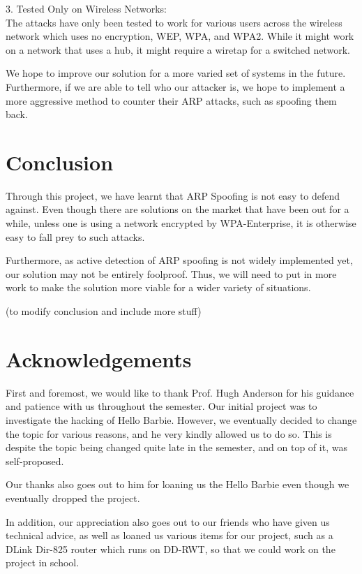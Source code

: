 \documentclass{acm_proc_article-sp}
\begin{document}
3. Tested Only on Wireless Networks:\\
The attacks have only been tested to work for various users across the wireless network which uses no encryption, WEP, WPA, and WPA2. While it might work on a network that uses a hub, it might require a wiretap for a switched network.  

We hope to improve our solution for a more varied set of systems in the future. Furthermore, if we are able to tell who our attacker is, we hope to implement a more aggressive method to counter their ARP attacks, such as spoofing them back. 

\section{Conclusion}
Through this project, we have learnt that ARP Spoofing is not easy to defend against. Even though there are solutions on the market that have been out for a while, unless one is using a network encrypted by WPA-Enterprise, it is otherwise easy to fall prey to such attacks. 

Furthermore, as active detection of ARP spoofing is not widely implemented yet, our solution may not be entirely foolproof. Thus, we will need to put in more work to make the solution more viable for a wider variety of situations. 

(to modify conclusion and include more stuff) 

\section{Acknowledgements}
First and foremost, we would like to thank Prof. Hugh Anderson for his guidance and patience with us throughout the semester. Our initial project was to investigate the hacking of Hello Barbie. However, we eventually decided to change the topic for various reasons, and he very kindly allowed us to do so. This is despite the topic being changed quite late in the semester, and on top of it, was self-proposed. 

Our thanks also goes out to him for loaning us the Hello Barbie even though we eventually dropped the project. 

In addition, our appreciation also goes out to our friends who have given us technical advice, as well as loaned us various items for our project, such as a DLink Dir-825 router which runs on DD-RWT, so that we could work on the project in school. 
\end{document}
